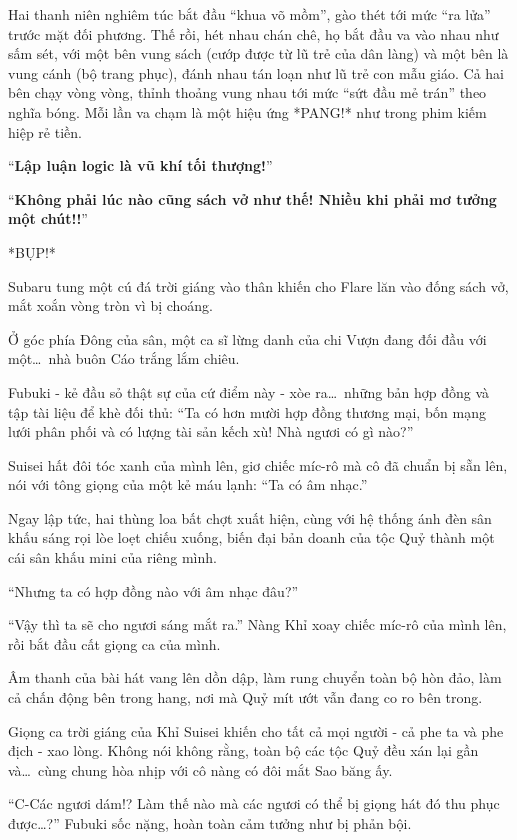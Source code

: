 \documentclass[../main.tex]{subfiles}
\begin{document}
Hai thanh niên nghiêm túc bắt đầu ``khua võ mồm'', gào thét tới mức ``ra lửa'' trước mặt đối phương. Thế rồi, hét nhau chán chê, họ bắt đầu va vào nhau như sấm sét, với một bên vung sách (cướp được từ lũ trẻ của dân làng) và một bên là vung cánh (bộ trang phục), đánh nhau tán loạn như lũ trẻ con mẫu giáo. Cả hai bên chạy vòng vòng, thỉnh thoảng vung nhau tới mức ``sứt đầu mẻ trán'' theo nghĩa bóng. Mỗi lần va chạm là một hiệu ứng *PANG!* như trong phim kiếm hiệp rẻ tiền.

``\textbf{Lập luận logic là vũ khí tối thượng!}''

``\textbf{Không phải lúc nào cũng sách vở như thế! Nhiều khi phải mơ tưởng một chút!!}''

*BỤP!*

Subaru tung một cú đá trời giáng vào thân khiến cho Flare lăn vào đống sách vở, mắt xoắn vòng tròn vì bị choáng.

\ct

Ở góc phía Đông của sân, một ca sĩ lừng danh của chi Vượn đang đối đầu với một\dots\ nhà buôn Cáo trắng lắm chiêu.

Fubuki - kẻ đầu sỏ thật sự của cứ điểm này - xòe ra\dots\ những bản hợp đồng và tập tài liệu để khè đối thủ: ``Ta có hơn mười hợp đồng thương mại, bốn mạng lưới phân phối và có lượng tài sản kếch xù! Nhà ngươi có gì nào?''

Suisei hất đôi tóc xanh của mình lên, giơ chiếc míc-rô mà cô đã chuẩn bị sẵn lên, nói với tông giọng của một kẻ máu lạnh: ``Ta có âm nhạc.''

Ngay lập tức, hai thùng loa bất chợt xuất hiện, cùng với hệ thống ánh đèn sân khấu sáng rọi lòe loẹt chiếu xuống, biến đại bản doanh của tộc Quỷ thành một cái sân khấu mini của riêng mình.

``Nhưng ta có hợp đồng nào với âm nhạc đâu?''

``Vậy thì ta sẽ cho ngươi sáng mắt ra.'' Nàng Khỉ xoay chiếc míc-rô của mình lên, rồi bắt đầu cất giọng ca của mình.

Âm thanh của bài hát vang lên dồn dập, làm rung chuyển toàn bộ hòn đảo, làm cả chấn động bên trong hang, nơi mà Quỷ mít ướt vẫn đang co ro bên trong.

Giọng ca trời giáng của Khỉ Suisei khiến cho tất cả mọi người - cả phe ta và phe địch - xao lòng. Không nói không rằng, toàn bộ các tộc Quỷ đều xán lại gần và\dots\ cùng chung hòa nhịp với cô nàng có đôi mắt Sao băng ấy.

``C-Các ngươi dám!? Làm thế nào mà các ngươi có thể bị giọng hát đó thu phục được\dots?'' Fubuki sốc nặng, hoàn toàn cảm tưởng như bị phản bội.
\end{document}
